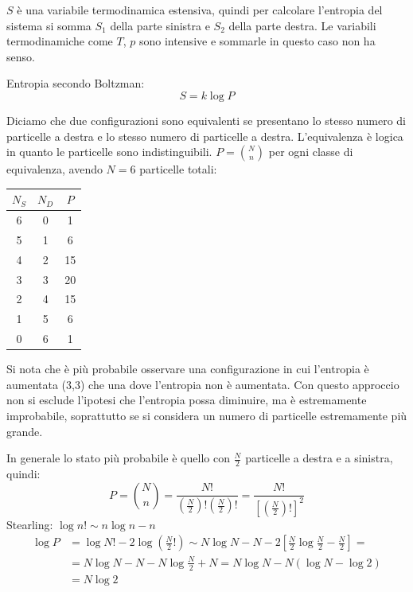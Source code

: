 $S$ è una variabile termodinamica estensiva, quindi per calcolare l'entropia del sistema si somma $S_1$ della parte sinistra e $S_2$ della parte destra. Le variabili termodinamiche come $T$, $p$ sono intensive e sommarle in questo caso non ha senso.
\begin{legge}
Entropia secondo Boltzman:
\begin{equation}
S=k\log P
\end{equation}
\end{legge}
Diciamo che due configurazioni sono equivalenti se presentano lo stesso numero di particelle a destra e lo stesso numero di particelle a destra. L'equivalenza è logica in quanto le particelle sono indistinguibili. $P=\binom{N}{n}$ per ogni classe di equivalenza, avendo $N=6$ particelle totali:
\begin{center}
\begin{tabular}{c|c|c}
$N_S$&$N_D$&$P$\\
\hline
6&0&1\\
5&1&6\\
4&2&15\\
3&3&20\\
2&4&15\\
1&5&6\\
0&6&1\\
\end{tabular}
\end{center}
Si nota che è più probabile osservare una configurazione in cui l'entropia è aumentata (3,3) che una dove l'entropia non è aumentata. Con questo approccio non si esclude l'ipotesi che l'entropia possa diminuire, ma è estremamente improbabile, soprattutto se si considera un numero di particelle estremamente più grande.

In generale lo stato più probabile è quello con $\frac{N}{2}$ particelle a destra e a sinistra, quindi:
\begin{equation*}P=\binom{N}{n}=\frac{N!}{\left(\frac{N}{2}\right)!\left(\frac{N}{2}\right)!}=\frac{N!}{\left[\left(\frac{N}{2}\right)!\right]^2}\end{equation*}
Stearling: $\log n!\sim n\log n-n$
\begin{align*}
\log P&=\log N!-2\log\left(\frac{N}{2}!\right)\sim N\log N-N-2\left[\frac{N}{2}\log\frac{N}{2}-\frac{N}{2}\right]=\\
&=N\log N-N-N\log\frac{N}{2}+N=N\log N-N\left(\log N-\log 2\right)\\
&=N\log 2
\end{align*}

